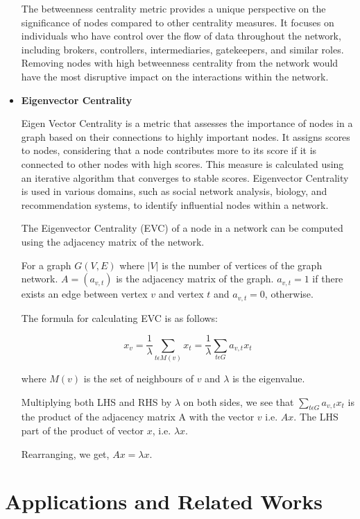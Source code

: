 \documentclass{article}
\begin{document}
\begin{itemize}
The betweenness centrality metric provides a unique perspective on the significance of nodes compared to other centrality measures. It focuses on individuals who have control over the flow of data throughout the network, including brokers, controllers, intermediaries, gatekeepers, and similar roles. Removing nodes with high betweenness centrality from the network would have the most disruptive impact on the interactions within the network.

\item \textbf{Eigenvector Centrality}

Eigen Vector Centrality is a metric that assesses the importance of nodes in a graph based on their connections to highly important nodes. It assigns scores to nodes, considering that a node contributes more to its score if it is connected to other nodes with high scores. This measure is calculated using an iterative algorithm that converges to stable scores. Eigenvector Centrality is used in various domains, such as social network analysis, biology, and recommendation systems, to identify influential nodes within a network.

The Eigenvector Centrality (EVC) of a node in a network can be computed using the adjacency matrix of the network. 

For a graph $G(V, E)$ where $|V|$ is the number of vertices of the graph network.  $A = (a_{v,t})$ is the adjacency matrix of the graph. $ a_{v,t} = 1 $ if there exists an edge between vertex $v$ and vertex $t$ and $ a_{v,t} = 0 $, otherwise. 

The formula for calculating EVC is as follows:

$$ x_{v} = \frac{1}{\lambda} \sum_{t \epsilon M(v)} x_{t} = \frac{1}{\lambda} \sum_{t \epsilon G } a_{v,t}x_{t} $$

where $M(v)$ is the set of neighbours of $v$ and $\lambda$ is the eigenvalue. 

Multiplying both LHS and RHS by $\lambda$ on both sides, we see that $\sum_{t \epsilon G} a_{v,t}x_{t}$ is the product of the adjacency matrix A with the vector $v$ i.e. $Ax$. The LHS part of the product of vector $x$, i.e. $\lambda x$.

Rearranging, we get, $Ax = \lambda x$.

\end{itemize}

\section*{Applications and Related Works}
\end{document}
